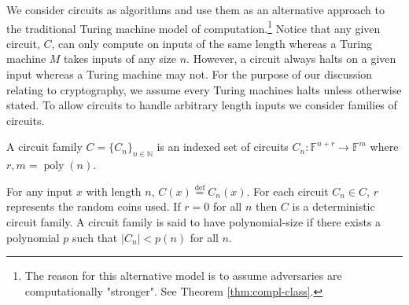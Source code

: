 We consider circuits as algorithms and use them as an alternative approach to the traditional Turing machine model of computation.\footnote{The reason for this alternative model is to assume adversaries are computationally "stronger". See Theorem \ref{thm:compl-class}.} Notice that any given circuit, $C$, can only compute on inputs of the same length whereas a Turing machine $M$ takes inputs of any size $n$. However, a circuit always halts on a given input whereas a Turing machine may not. For the purpose of our discussion relating to cryptography, we assume every Turing machines halts unless otherwise stated. To allow circuits to handle arbitrary length inputs we consider families of circuits.  

\begin{definition}
A circuit family $C = \{C_n\}_{n \in \mathbb{N}}$ is an indexed set of circuits $C_n \colon \mathbb{F}^{n + r} \to \mathbb{F}^m$ where $r,m = \operatorname{poly}(n)$.
\end{definition}

For any input $x$ with length $n$, $C(x) \stackrel{\mathrm{def}}{=} C_n(x)$. For each circuit $C_n \in C$, $r$ represents the random coins used. If $r = 0$ for all $n$ then $C$ is a deterministic circuit family. A circuit family is said to have polynomial-size if there exists a polynomial $p$ such that $|C_n| < p(n)$ for all $n$. 

